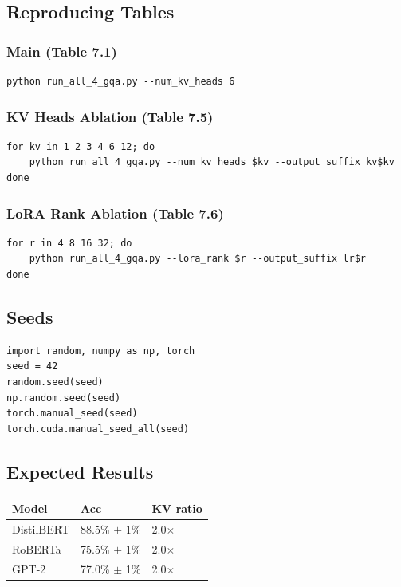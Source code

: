 \subsection{Reproducing Tables}

\subsubsection{Main (Table 7.1)}

\begin{lstlisting}
python run_all_4_gqa.py --num_kv_heads 6
\end{lstlisting}

\subsubsection{KV Heads Ablation (Table 7.5)}

\begin{lstlisting}
for kv in 1 2 3 4 6 12; do
    python run_all_4_gqa.py --num_kv_heads $kv --output_suffix kv$kv
done
\end{lstlisting}

\subsubsection{LoRA Rank Ablation (Table 7.6)}

\begin{lstlisting}
for r in 4 8 16 32; do
    python run_all_4_gqa.py --lora_rank $r --output_suffix lr$r
done
\end{lstlisting}

\subsection{Seeds}

\begin{lstlisting}
import random, numpy as np, torch
seed = 42
random.seed(seed)
np.random.seed(seed)
torch.manual_seed(seed)
torch.cuda.manual_seed_all(seed)
\end{lstlisting}

\subsection{Expected Results}

\begin{table}[H]
\centering
\small
\begin{tabular}{lll}
\toprule
\textbf{Model} & \textbf{Acc} & \textbf{KV ratio} \\
\midrule
DistilBERT & 88.5\% $\pm$ 1\% & 2.0$\times$ \\
RoBERTa & 75.5\% $\pm$ 1\% & 2.0$\times$ \\
GPT-2 & 77.0\% $\pm$ 1\% & 2.0$\times$ \\
\bottomrule
\end{tabular}
\end{table}

